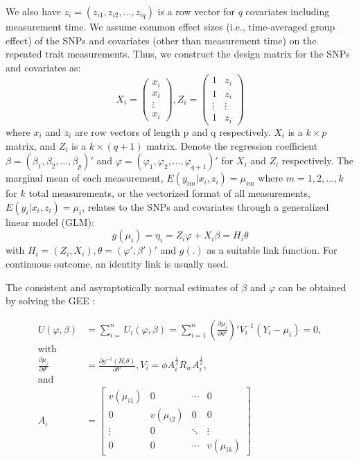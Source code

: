 \documentclass[12pt]{article}
\begin{document}
We also have $z_i = (z_{i1}, z_{i2}, \ldots, z_{iq})$ is a row vector for $q$ covariates including measurement time. We assume common effect sizes (i.e., time-averaged group effect) of the SNPs and covariates (other than measurement time) on the repeated trait measurements. Thus, we construct the design matrix for the SNPs and covariates as:
$$
  X_i = \begin{pmatrix}
          x_{i}\\
          x_{i}\\
          \vdots\\
          x_{i}
          \end{pmatrix} 
  , 
  Z_{i}=\begin{pmatrix}1 & z_{i}\\
          1 & z_{i}\\
          \vdots & \vdots\\
          1 & z_{i}
          \end{pmatrix}
$$
where $x_i$ and $z_i$ are row vectors of length p and q respectively. $X_i$ is a $k \times p$ matrix, and $Z_{i}$ is a $k \times (q+1)$ matrix. Denote the regression coefficient $\beta = (\beta_1, \beta_2, \ldots, \beta_p)'$ and $\varphi = (\varphi_1, \varphi_2, \ldots, \varphi_{q+1})'$ for $X_i$ and $Z_i$ respectively. The marginal mean of each measurement, $E(y_{im}|x_i,z_i) = \mu_{im}$ where $m = 1,2, \ldots, k$ for $k$ total measurements, or the vectorized format of all measurements, $E(y_{i}|x_i,z_i) = \mu_{i}$, relates to the SNPs and covariates through a generalized linear model (GLM):
$$
g(\mu_i) = \eta_i = Z_i \varphi + X_i \beta = H_i \theta
$$
\noindent with $H_i = (Z_i, X_i), \theta = (\varphi', \beta')'$ and $g(.)$ as a suitable link function. For continuous outcome, an identity link is usually used.

The consistent and asymptotically normal estimates of $\beta$ and $\varphi$ can be obtained by solving the GEE \cite{liang1986longitudinal}: 

\begin{align*}
U(\varphi,\beta) & =\sum_{i=}^{n}U_{i}(\varphi,\beta)=\sum_{i=1}^{n}(\frac{\partial\mu_{i}}{\partial\theta'})'V_i^{-1}(Y_{i}-\mu_{i})=0,\\
\textrm{with}\\
\frac{\partial\mu_{i}}{\partial\theta'} & =\frac{\partial g^{-1}(H_{i}\theta)}{\partial\theta'}, V_i = \phi A_{i}^{\frac{1}{2}}R_{w}A_{i}^{\frac{1}{2}},\\
\textrm{and}\\
A_{i} &= 
\begin{bmatrix}
 v(\mu_{i1}) & 0 & \cdots & 0\\
 0 & v(\mu_{i2}) & 0 & 0\\
 \vdots & 0 & \ddots & \vdots\\
 0 & 0 & \cdots & v(\mu_{ik})
\end{bmatrix}
\end{align*}
\end{document}
